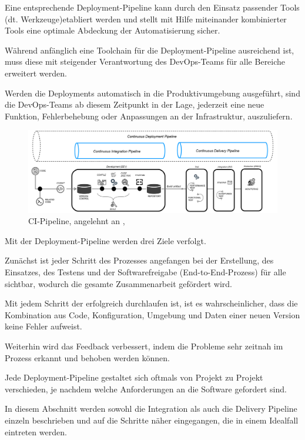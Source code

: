 Eine entsprechende Deployment-Pipeline kann durch den Einsatz passender Tools (dt. Werkzeuge)etabliert werden und stellt mit Hilfe miteinander kombinierter Tools eine optimale Abdeckung der Automatisierung sicher. \cite[S. 268]{tokarski_strategische_2018} 

Während anfänglich eine Toolchain für die Deployment-Pipeline ausreichend ist, muss diese mit steigender Verantwortung des DevOps-Teams für alle Bereiche erweitert werden. 

Werden die Deployments automatisch in die Produktivumgebung ausgeführt, sind die DevOps-Teams ab diesem Zeitpunkt in der Lage, jederzeit eine neue Funktion, Fehlerbehebung oder Anpassungen an der Infrastruktur, auszuliefern. \cite{juner_praxisbasierte_2017} 

\begin{figure}[h]
    \centering
    \includegraphics[scale=0.4]{Bilder/Continuous Deployment Pipeline.png}
    \caption{CI-Pipeline, angelehnt an \cite{balajee_what_2020}, \cite[S. 17]{sharma_devops_2017}}
\end{figure}

Mit der Deployment-Pipeline werden drei Ziele verfolgt. \cite[S. 3 - 4]{humble_continuous_2011} 

Zunächst ist jeder Schritt des Prozesses angefangen bei der Erstellung, des Einsatzes, des Testens und der Softwarefreigabe (End-to-End-Prozess) für alle sichtbar, wodurch die gesamte Zusammenarbeit gefördert wird. 

Mit jedem Schritt der erfolgreich durchlaufen ist, ist es wahrscheinlicher, dass die Kombination aus Code, Konfiguration, Umgebung und Daten einer neuen Version keine Fehler aufweist. 

Weiterhin wird das Feedback verbessert, indem die Probleme sehr zeitnah im Prozess erkannt und behoben werden können. 

Jede Deployment-Pipeline gestaltet sich oftmals von Projekt zu Projekt verschieden, je nachdem welche Anforderungen an die Software gefordert sind.  

In diesem Abschnitt werden sowohl die Integration als auch die Delivery Pipeline einzeln beschrieben und auf die Schritte näher eingegangen, die in einem Idealfall eintreten werden. 

